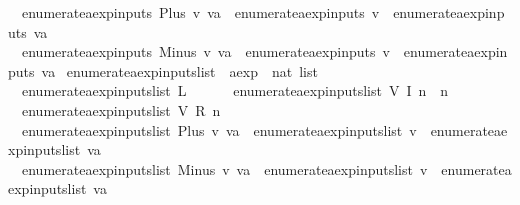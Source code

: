 \begin{isabellebody}
\ \ {\isachardoublequoteopen}enumerate{\isacharunderscore}aexp{\isacharunderscore}inputs\ {\isacharparenleft}Plus\ v\ va{\isacharparenright}\ {\isacharequal}\ enumerate{\isacharunderscore}aexp{\isacharunderscore}inputs\ v\ {\isasymunion}\ enumerate{\isacharunderscore}aexp{\isacharunderscore}inputs\ va{\isachardoublequoteclose}\ {\isacharbar}\isanewline
\ \ {\isachardoublequoteopen}enumerate{\isacharunderscore}aexp{\isacharunderscore}inputs\ {\isacharparenleft}Minus\ v\ va{\isacharparenright}\ {\isacharequal}\ enumerate{\isacharunderscore}aexp{\isacharunderscore}inputs\ v\ {\isasymunion}\ enumerate{\isacharunderscore}aexp{\isacharunderscore}inputs\ va{\isachardoublequoteclose}\isanewline
\isanewline
{}\isamarkupfalse%
\ enumerate{\isacharunderscore}aexp{\isacharunderscore}inputs{\isacharunderscore}list\ {\isacharcolon}{\isacharcolon}\ {\isachardoublequoteopen}aexp\ {\isasymRightarrow}\ nat\ list{\isachardoublequoteclose}\ \isanewline
\ \ {\isachardoublequoteopen}enumerate{\isacharunderscore}aexp{\isacharunderscore}inputs{\isacharunderscore}list\ {\isacharparenleft}L\ {\isacharunderscore}{\isacharparenright}\ {\isacharequal}\ {\isacharbrackleft}{\isacharbrackright}{\isachardoublequoteclose}\ {\isacharbar}\isanewline
\ \ {\isachardoublequoteopen}enumerate{\isacharunderscore}aexp{\isacharunderscore}inputs{\isacharunderscore}list\ {\isacharparenleft}V\ {\isacharparenleft}I\ n{\isacharparenright}{\isacharparenright}\ {\isacharequal}\ {\isacharbrackleft}n{\isacharbrackright}{\isachardoublequoteclose}\ {\isacharbar}\isanewline
\ \ {\isachardoublequoteopen}enumerate{\isacharunderscore}aexp{\isacharunderscore}inputs{\isacharunderscore}list\ {\isacharparenleft}V\ {\isacharparenleft}R\ n{\isacharparenright}{\isacharparenright}\ {\isacharequal}\ {\isacharbrackleft}{\isacharbrackright}{\isachardoublequoteclose}\ {\isacharbar}\isanewline
\ \ {\isachardoublequoteopen}enumerate{\isacharunderscore}aexp{\isacharunderscore}inputs{\isacharunderscore}list\ {\isacharparenleft}Plus\ v\ va{\isacharparenright}\ {\isacharequal}\ enumerate{\isacharunderscore}aexp{\isacharunderscore}inputs{\isacharunderscore}list\ v\ {\isacharat}\ enumerate{\isacharunderscore}aexp{\isacharunderscore}inputs{\isacharunderscore}list\ va{\isachardoublequoteclose}\ {\isacharbar}\isanewline
\ \ {\isachardoublequoteopen}enumerate{\isacharunderscore}aexp{\isacharunderscore}inputs{\isacharunderscore}list\ {\isacharparenleft}Minus\ v\ va{\isacharparenright}\ {\isacharequal}\ enumerate{\isacharunderscore}aexp{\isacharunderscore}inputs{\isacharunderscore}list\ v\ {\isacharat}\ enumerate{\isacharunderscore}aexp{\isacharunderscore}inputs{\isacharunderscore}list\ va{\isachardoublequoteclose}\isanewline

\end{isabellebody}
